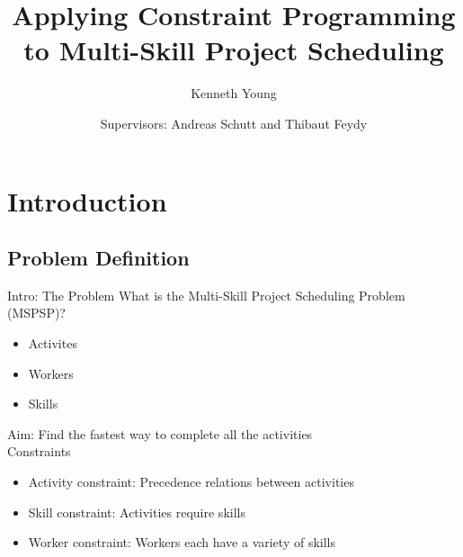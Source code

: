 \documentclass{beamer}
\title{Applying Constraint Programming to Multi-Skill Project Scheduling}
\author{Kenneth Young}
\date{Supervisors: Andreas Schutt and Thibaut Feydy}
\begin{document}
\maketitle

\section{Introduction}
\subsection{Problem Definition}
\begin{frame}{Intro: The Problem}
	\pause What is the Multi-Skill Project Scheduling Problem (MSPSP)?\pause
	\begin{itemize}
		\item Activites\pause
		\item Workers\pause
		\item Skills\pause
	\end{itemize}
	\vspace{4mm}
	\alert{Aim:} Find the fastest way to complete all the activities\pause\\
	\vspace{4mm}
	Constraints\pause
	\begin{itemize}
		\item Activity constraint: Precedence relations between activities\pause
		\item Skill constraint: Activities require skills\pause
		\item Worker constraint: Workers each have a variety of skills
	\end{itemize}
\end{frame}
\end{document}
